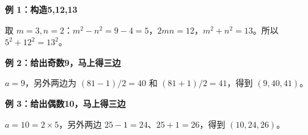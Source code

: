 \clearpage
\begin{examplebox}
\textbf{\textcolor{CExample}{例 1：构造5,12,13}}
\par\medskip
\begin{center}

\end{center}
\medskip
取 $m=3,n=2$：$m^2-n^2=9-4=5$，$2mn=12$，$m^2+n^2=13$。所以 $5^2+12^2=13^2$。
\end{examplebox}
\clearpage
\begin{examplebox}
\textbf{\textcolor{CExample}{例 2：给出奇数9，马上得三边}}
\par\medskip
\begin{center}

\end{center}
\medskip
$a=9$，另外两边为 $(81-1)/2=40$ 和 $(81+1)/2=41$，得到 $\boxed{(9,40,41)}$。
\end{examplebox}
\clearpage
\begin{examplebox}
\textbf{\textcolor{CExample}{例 3：给出偶数10，马上得三边}}
\par\medskip
\begin{center}

\end{center}
\medskip
$a=10=2\times5$，另外两边 $25-1=24$、$25+1=26$，得到 $\boxed{(10,24,26)}$。
\end{examplebox}
